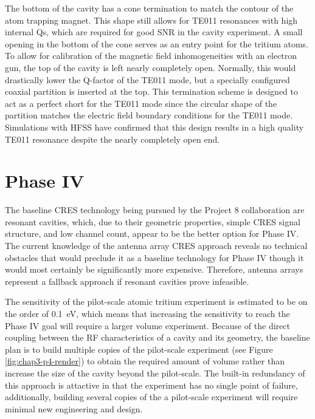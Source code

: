 The bottom of the cavity has a cone termination to match the contour of the atom trapping magnet. This shape still allows for TE011 resonances with high internal Qs, which are required for good SNR in the cavity experiment. A small opening in the bottom of the cone serves as an entry point for the tritium atoms. To allow for calibration of the magnetic field inhomogeneities with an electron gun, the top of the cavity is left nearly completely open. Normally, this would drastically lower the Q-factor of the TE011 mode, but a specially configured coaxial partition is inserted at the top. This termination scheme is designed to act as a perfect short for the TE011 mode since the circular shape of the partition matches the electric field boundary conditions for the TE011 mode. Simulations with HFSS have confirmed that this design results in a high quality TE011 resonance despite the nearly completely open end.

\section{Phase IV}

The baseline CRES technology being pursued by the Project 8 collaboration are resonant cavities, which, due to their geometric properties, simple CRES signal structure, and low channel count, appear to be the better option for Phase IV. The current knowledge of the antenna array CRES approach reveals no technical obstacles that would preclude it as a baseline technology for Phase IV though it would most certainly be significantly more expensive. Therefore, antenna arrays represent a fallback approach if resonant cavities prove infeasible.

The sensitivity of the pilot-scale atomic tritium experiment is estimated to be on the order of 0.1~eV, which means that increasing the sensitivity to reach the Phase IV goal will require a larger volume experiment. Because of the direct coupling between the RF characteristics of a cavity and its geometry, the baseline plan is to build multiple copies of the pilot-scale experiment (see Figure \ref{fig:chap3-p4-render}) to obtain the required amount of volume rather than increase the size of the cavity beyond the pilot-scale. The built-in redundancy of this approach is attactive in that the experiment has no single point of failure, additionally, building several copies of the a pilot-scale experiment will require minimal new engineering and design.

